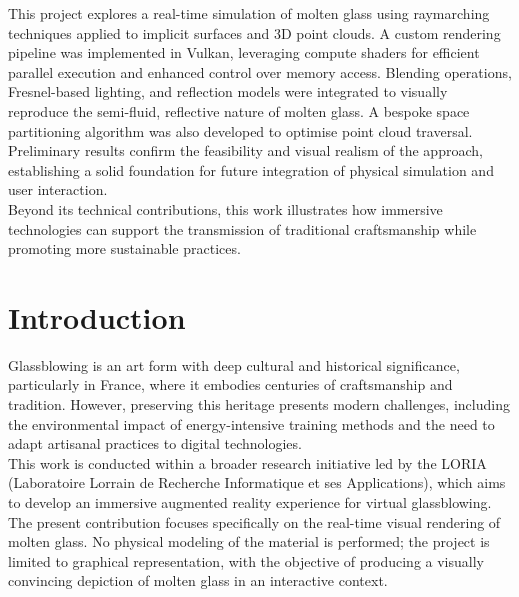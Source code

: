 \documentclass{rapportcs}
\begin{document}
        This project explores a real-time simulation of molten glass using raymarching techniques applied to implicit surfaces and 3D point clouds. A custom rendering pipeline was implemented in Vulkan, leveraging compute shaders for efficient parallel execution and enhanced control over memory access. Blending operations, Fresnel-based lighting, and reflection models were integrated to visually reproduce the semi-fluid, reflective nature of molten glass. A bespoke space partitioning algorithm was also developed to optimise point cloud traversal. \\
        Preliminary results confirm the feasibility and visual realism of the approach, establishing a solid foundation for future integration of physical simulation and user interaction. \\
        Beyond its technical contributions, this work illustrates how immersive technologies can support the transmission of traditional craftsmanship while promoting more sustainable practices.
    

\newpage

\begingroup %
\color{blue}
\renewcommand*\contentsname{Table of contents}
\tabledematieres %
\endgroup


\section{Introduction}

    Glassblowing is an art form with deep cultural and historical significance, particularly in France, where it embodies centuries of craftsmanship and tradition. However, preserving this heritage presents modern challenges, including the environmental impact of energy-intensive training methods and the need to adapt artisanal practices to digital technologies. \\
    
    This work is conducted within a broader research initiative led by the LORIA (Laboratoire Lorrain de Recherche Informatique et ses Applications), which aims to develop an immersive augmented reality experience for virtual glassblowing. The present contribution focuses specifically on the real-time visual rendering of molten glass. No physical modeling of the material is performed; the project is limited to graphical representation, with the objective of producing a visually convincing depiction of molten glass in an interactive context. \\
    
\end{document}
